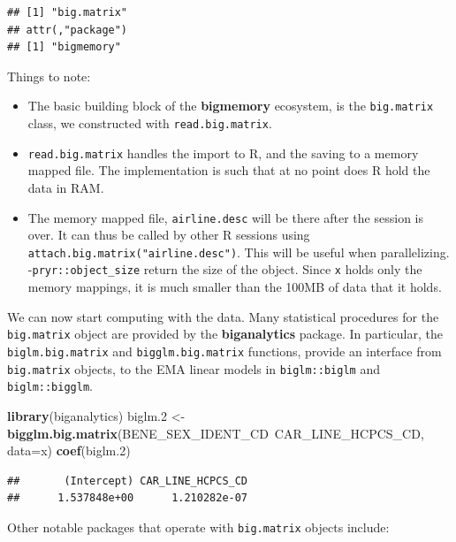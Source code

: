 \documentclass[]{book}
\newenvironment{Shaded}{\begin{snugshade}}{\end{snugshade}}
\newcommand{\KeywordTok}[1]{\textcolor[rgb]{0.13,0.29,0.53}{\textbf{{#1}}}}
\newcommand{\DataTypeTok}[1]{\textcolor[rgb]{0.13,0.29,0.53}{{#1}}}
\newcommand{\FloatTok}[1]{\textcolor[rgb]{0.00,0.00,0.81}{{#1}}}
\newcommand{\StringTok}[1]{\textcolor[rgb]{0.31,0.60,0.02}{{#1}}}
\newcommand{\NormalTok}[1]{{#1}}
\providecommand{\tightlist}{%
  \setlength{\itemsep}{0pt}\setlength{\parskip}{0pt}}
\theoremstyle{definition}
\theoremstyle{definition}
\theoremstyle{remark}
\begin{document}
\begin{verbatim}
## [1] "big.matrix"
## attr(,"package")
## [1] "bigmemory"
\end{verbatim}

Things to note:

\begin{itemize}
\tightlist
\item
  The basic building block of the \textbf{bigmemory} ecosystem, is the
  \texttt{big.matrix} class, we constructed with
  \texttt{read.big.matrix}.
\item
  \texttt{read.big.matrix} handles the import to R, and the saving to a
  memory mapped file. The implementation is such that at no point does R
  hold the data in RAM.
\item
  The memory mapped file, \texttt{airline.desc} will be there after the
  session is over. It can thus be called by other R sessions using
  \texttt{attach.big.matrix("airline.desc")}. This will be useful when
  parallelizing. -\texttt{pryr::object\_size} return the size of the
  object. Since \texttt{x} holds only the memory mappings, it is much
  smaller than the 100MB of data that it holds.
\end{itemize}

We can now start computing with the data. Many statistical procedures
for the \texttt{big.matrix} object are provided by the
\textbf{biganalytics} package. In particular, the
\texttt{biglm.big.matrix} and \texttt{bigglm.big.matrix} functions,
provide an interface from \texttt{big.matrix} objects, to the EMA linear
models in \texttt{biglm::biglm} and \texttt{biglm::bigglm}.

\begin{Shaded}
\begin{Highlighting}[]
\KeywordTok{library}\NormalTok{(biganalytics)}
\NormalTok{biglm}\FloatTok{.2} \NormalTok{<-}\StringTok{ }\KeywordTok{bigglm.big.matrix}\NormalTok{(BENE_SEX_IDENT_CD~CAR_LINE_HCPCS_CD, }\DataTypeTok{data=}\NormalTok{x)}
\KeywordTok{coef}\NormalTok{(biglm}\FloatTok{.2}\NormalTok{)}
\end{Highlighting}
\end{Shaded}

\begin{verbatim}
##       (Intercept) CAR_LINE_HCPCS_CD 
##      1.537848e+00      1.210282e-07
\end{verbatim}

Other notable packages that operate with \texttt{big.matrix} objects
include:
\end{document}
